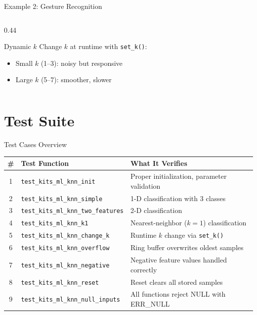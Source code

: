 \documentclass[aspectratio=169, 10pt]{beamer}
\begin{document}
\begin{frame}[fragile]{Example 2: Gesture Recognition}
\begin{columns}[T]
\begin{column}{0.44\textwidth}
\vspace{0.5em}
\begin{block}{Dynamic $k$}
Change $k$ at runtime with \texttt{set\_k()}:
\begin{itemize}
  \item Small $k$ (1--3): noisy but responsive
  \item Large $k$ (5--7): smoother, slower
\end{itemize}
\end{block}
\end{column}
\end{columns}
\end{frame}

\section{Test Suite}

\begin{frame}{Test Cases Overview}
\begin{table}
\centering
\small
\begin{tabular}{@{}clp{7cm}@{}}
\toprule
\textbf{\#} & \textbf{Test Function} & \textbf{What It Verifies} \\
\midrule
1 & \texttt{test\_kits\_ml\_knn\_init}
  & Proper initialization, parameter validation \\
2 & \texttt{test\_kits\_ml\_knn\_simple}
  & 1-D classification with 3 classes \\
3 & \texttt{test\_kits\_ml\_knn\_two\_features}
  & 2-D classification \\
4 & \texttt{test\_kits\_ml\_knn\_k1}
  & Nearest-neighbor ($k=1$) classification \\
5 & \texttt{test\_kits\_ml\_knn\_change\_k}
  & Runtime $k$ change via \texttt{set\_k()} \\
6 & \texttt{test\_kits\_ml\_knn\_overflow}
  & Ring buffer overwrites oldest samples \\
7 & \texttt{test\_kits\_ml\_knn\_negative}
  & Negative feature values handled correctly \\
8 & \texttt{test\_kits\_ml\_knn\_reset}
  & Reset clears all stored samples \\
9 & \texttt{test\_kits\_ml\_knn\_null\_inputs}
  & All functions reject NULL with ERR\_NULL \\
\bottomrule
\end{tabular}
\end{table}
\end{frame}
\end{document}
